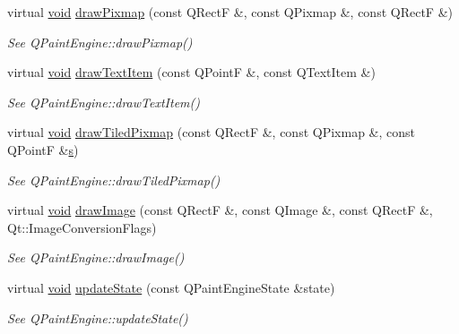 \begin{DoxyCompactItemize}
virtual \hyperlink{group___u_a_v_objects_plugin_ga444cf2ff3f0ecbe028adce838d373f5c}{void} \hyperlink{class_qwt_null_paint_device_a1a0a2f22ea26bdf74becd5e5813f8f6f}{draw\-Pixmap} (const Q\-Rect\-F \&, const Q\-Pixmap \&, const Q\-Rect\-F \&)
\begin{DoxyCompactList}\small\item\em See Q\-Paint\-Engine\-::draw\-Pixmap() \end{DoxyCompactList}\item 
virtual \hyperlink{group___u_a_v_objects_plugin_ga444cf2ff3f0ecbe028adce838d373f5c}{void} \hyperlink{class_qwt_null_paint_device_a9c0566fc34422c4bd61534cebfb95d63}{draw\-Text\-Item} (const Q\-Point\-F \&, const Q\-Text\-Item \&)
\begin{DoxyCompactList}\small\item\em See Q\-Paint\-Engine\-::draw\-Text\-Item() \end{DoxyCompactList}\item 
virtual \hyperlink{group___u_a_v_objects_plugin_ga444cf2ff3f0ecbe028adce838d373f5c}{void} \hyperlink{class_qwt_null_paint_device_a256a8a39d0f32fb210c4561fe1b3f867}{draw\-Tiled\-Pixmap} (const Q\-Rect\-F \&, const Q\-Pixmap \&, const Q\-Point\-F \&\hyperlink{glext_8h_ad585a1393cfa368fa9dc3d8ebff640d5}{s})
\begin{DoxyCompactList}\small\item\em See Q\-Paint\-Engine\-::draw\-Tiled\-Pixmap() \end{DoxyCompactList}\item 
virtual \hyperlink{group___u_a_v_objects_plugin_ga444cf2ff3f0ecbe028adce838d373f5c}{void} \hyperlink{class_qwt_null_paint_device_a6a18a677959e446b34419d398d4fc4c7}{draw\-Image} (const Q\-Rect\-F \&, const Q\-Image \&, const Q\-Rect\-F \&, Qt\-::\-Image\-Conversion\-Flags)
\begin{DoxyCompactList}\small\item\em See Q\-Paint\-Engine\-::draw\-Image() \end{DoxyCompactList}\item 
virtual \hyperlink{group___u_a_v_objects_plugin_ga444cf2ff3f0ecbe028adce838d373f5c}{void} \hyperlink{class_qwt_null_paint_device_a235bd4e1453a13f7c4c076a9595a8840}{update\-State} (const Q\-Paint\-Engine\-State \&state)
\begin{DoxyCompactList}\small\item\em See Q\-Paint\-Engine\-::update\-State() \end{DoxyCompactList}\end{DoxyCompactItemize}


